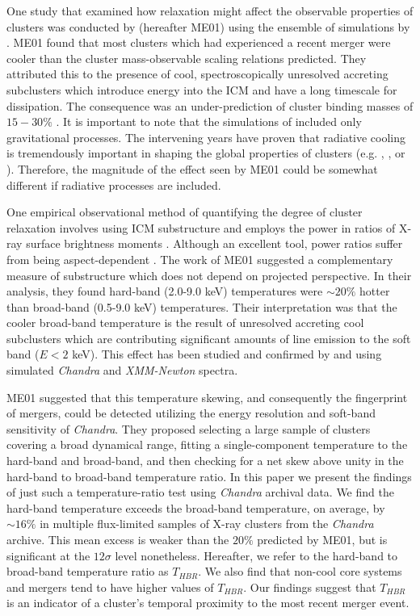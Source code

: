 \documentclass[apj]{emulateapj}
\begin{document}
One study that examined how relaxation might affect the observable
properties of clusters was conducted by \citealt{2001ApJ...546..100M}
(hereafter ME01) using the ensemble of simulations by
\citealt{1997ApJ...491...38M}. ME01 found that most clusters which had
experienced a recent merger were cooler than the cluster
mass-observable scaling relations predicted. They attributed this to the
presence of cool, spectroscopically unresolved accreting subclusters
which introduce energy into the ICM and have a long timescale for
dissipation. The consequence was an under-prediction of cluster
binding masses of $15-30\%$ \citep{2001ApJ...546..100M}. It is
important to note that the simulations of \cite{1997ApJ...491...38M}
included only gravitational processes. The intervening years have
proven that radiative cooling is tremendously important in shaping the
global properties of clusters (e.g. \citealt{2004ApJ...613..811M},
\citealt{2006MNRAS.373..881P}, or
\citealt{2007ApJ...668....1N}). Therefore, the magnitude of the effect
seen by ME01 could be somewhat different if radiative processes are
included.

One empirical observational method of quantifying the degree of
cluster relaxation involves using ICM substructure and employs the power in
ratios of X-ray surface brightness moments \citep{1995ApJ...452..522B,
1996ApJ...458...27B, 2005ApJ...624..606J}. Although an excellent tool,
power ratios suffer from being aspect-dependent
\citep{2007arXiv0708.1518J, VV08}. The work of ME01 suggested a
complementary measure of substructure which does not depend on
projected perspective. In their analysis, they found hard-band
(2.0-9.0 keV) temperatures were $\sim 20\%$ hotter than broad-band
(0.5-9.0 keV) temperatures. Their interpretation was that the cooler
broad-band temperature is the result of unresolved accreting cool
subclusters which are contributing significant amounts of line
emission to the soft band ($E < 2$ keV). This effect has been studied
and confirmed by \cite{2004MNRAS.354...10M} and
\cite{2006ApJ...640..710V} using simulated {\it Chandra} and
{\it{XMM-Newton}} spectra.

ME01 suggested that this temperature skewing, and consequently the
fingerprint of mergers, could be detected utilizing the energy
resolution and soft-band sensitivity of {\it Chandra}. They proposed
selecting a large sample of clusters covering a broad dynamical range,
fitting a single-component temperature to the hard-band and
broad-band, and then checking for a net skew above unity in the
hard-band to broad-band temperature ratio. In this paper we present
the findings of just such a temperature-ratio test using {\it Chandra}
archival data. We find the hard-band  temperature exceeds the
broad-band temperature, on average, by $\sim16\%$ in multiple
flux-limited samples of X-ray clusters from the {\it Chandra}
archive. This mean excess is weaker than the $20\%$ predicted by ME01,
but is significant at the $12\sigma$ level nonetheless. Hereafter, we
refer to the hard-band to broad-band temperature ratio as
$T_{HBR}$. We also find that non-cool core systems and mergers tend to
have higher values of $T_{HBR}$. Our findings suggest that $T_{HBR}$
is an indicator of a cluster's temporal proximity to the most recent
merger event.
\end{document}
